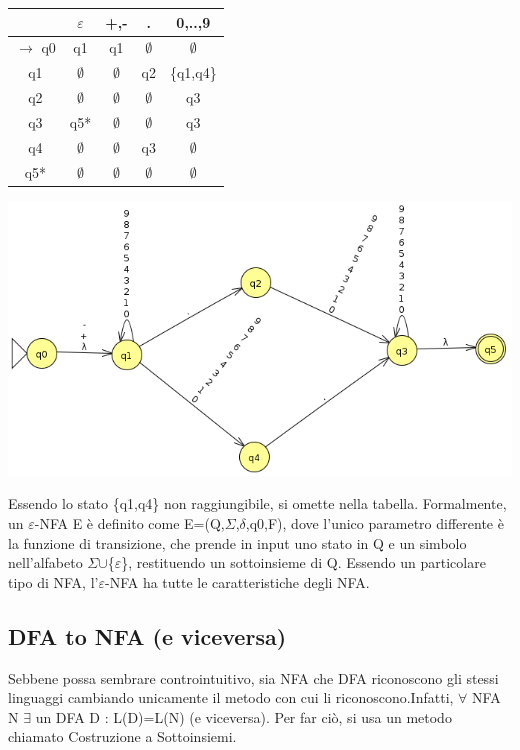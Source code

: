 \documentclass[]{article}
\begin{document}
				\begin{center}
					\begin{tabular}{c|c|c|c|c}
						&$\varepsilon$&+,-&.&0,..,9 \\
						\hline
						$\rightarrow$ q0 &q1&q1&$\emptyset$&$\emptyset$ \\
						q1 &$\emptyset$&$\emptyset$&q2&\{q1,q4\} \\
						q2 &$\emptyset$&$\emptyset$&$\emptyset$&q3 \\
						q3 &q5*&$\emptyset$&$\emptyset$&q3 \\
						q4 &$\emptyset$&$\emptyset$&q3&$\emptyset$ \\
						q5* &$\emptyset$&$\emptyset$&$\emptyset$&$\emptyset$
					\end{tabular}
					\includegraphics[scale=0.7]{e-NFA1.png}
				\end{center}
				Essendo lo stato \{q1,q4\} non raggiungibile, si omette nella tabella.\newline
				Formalmente, un $\varepsilon$-NFA E è definito come E=(Q,$\Sigma$,$\delta$,q0,F), dove l'unico parametro differente è la funzione di transizione, che prende in input uno stato in Q e un simbolo nell'alfabeto $\Sigma$$\cup$\{$\varepsilon$\}, restituendo un sottoinsieme di Q. \newline
				Essendo un particolare tipo di NFA, l'$\varepsilon$-NFA ha tutte le caratteristiche degli NFA.
		\subsection{DFA to NFA (e viceversa)}
			Sebbene possa sembrare controintuitivo, sia NFA che DFA riconoscono gli stessi linguaggi cambiando unicamente il metodo con cui li riconoscono.\newline Infatti, $\forall$ NFA N $\exists$ un DFA D : L(D)=L(N) (e viceversa). Per far ciò, si usa un metodo chiamato Costruzione a Sottoinsiemi.
\end{document}
